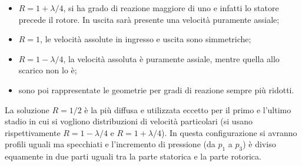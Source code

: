 \begin{itemize}
	\item $R = 1 + \lambda /4$, si ha grado di reazione maggiore di uno e infatti lo statore precede il rotore. In uscita sarà presente una velocità puramente assiale;
	\item $R = 1$, le velocità assolute in ingresso e uscita sono simmetriche;
	\item $R = 1 - \lambda/4$, la velocità assoluta è puramente assiale, mentre quella allo scarico non lo è;
	\item sono poi rappresentate le geometrie per gradi di reazione sempre più ridotti. 
\end{itemize}

La soluzione $R = 1/2$ è la più diffusa e utilizzata eccetto per il primo e l'ultimo stadio in cui si vogliono distribuzioni di velocità particolari (si usano rispettivamente $R = 1 - \lambda /4$ e $R = 1 + \lambda /4$). In questa configurazione si avranno profili uguali ma specchiati e l'incremento di pressione (da $p_1$ a $p_3$) è diviso equamente in due parti uguali tra la parte statorica e la parte rotorica. 

